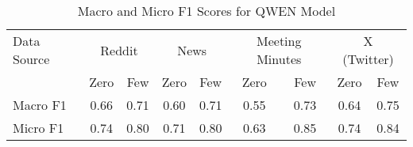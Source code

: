\begin{table}[htbp]
\centering
\begin{tabular}{l *{8}{c}}
\toprule
Data Source & \multicolumn{2}{c}{Reddit} & \multicolumn{2}{c}{News} & \multicolumn{2}{c}{Meeting Minutes} & \multicolumn{2}{c}{X (Twitter)} \\
& Zero & Few & Zero & Few & Zero & Few & Zero & Few \\
\midrule
Macro F1 & 0.66 & 0.71 & 0.60 & 0.71 & 0.55 & 0.73 & 0.64 & 0.75 \\
Micro F1 & 0.74 & 0.80 & 0.71 & 0.80 & 0.63 & 0.85 & 0.74 & 0.84 \\
\bottomrule
\end{tabular}
\caption{Macro and Micro F1 Scores for QWEN Model}
\label{tab:qwen_macro_micro}
\end{table}